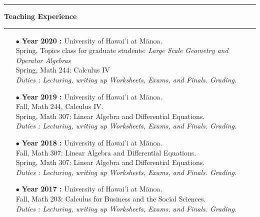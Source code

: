 \documentclass[a4paper,11pt]{article}
\newcommand{\titre}[1]{%
	\begin{center}
	\bigskip
	\rule{\textwidth}{1pt}
	\par\vspace{0.1cm}
        \textbf{\large #1}
	\par\rule{\textwidth}{1pt}
	\end{center}
	\bigskip
	}
\begin{document}
\newpage
\titre{Teaching Experience}
\begin{itemize}

\item[$\bullet$] \textbf{ Year 2020 :} University of Hawai'i at M\={a}noa.\\
					Spring, Topics class for graduate students: \textit{Large Scale Geometry and Operator Algebras}\\
					Spring, Math 244: Calculus IV\\
					\textit{Duties : Lecturing, writing up Worksheets, Exams, and Finals. Grading.}\\

\item[$\bullet$] \textbf{ Year 2019 :} University of Hawai'i at M\={a}noa.\\
					Fall, Math 244, Calculus IV.\\
					Spring, Math 307: Linear Algebra and Differential Equations.\\
					\textit{Duties : Lecturing, writing up Worksheets, Exams, and Finals. Grading.}\\

\item[$\bullet$] \textbf{ Year 2018 :} University of Hawai'i at M\={a}noa.\\
					Fall, Math 307: Linear Algebra and Differential Equations.\\
					Spring, Math 307: Linear Algebra and Differential Equations.\\
					\textit{Duties : Lecturing, writing up Worksheets, Exams, and Finals. Grading.}\\

\item[$\bullet$] \textbf{ Year 2017 :} University of Hawai'i at M\={a}noa.\\
					Fall, Math 203: Calculus for Business and the Social Sciences.\\
					\textit{Duties : Lecturing, writing up Worksheets, Exams, and Finals. Grading.}\\


\end{itemize}
\end{document}

